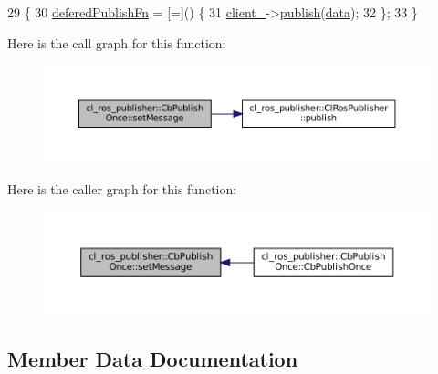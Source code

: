 \begin{DoxyCode}
29     \{
30         \hyperlink{classcl__ros__publisher_1_1CbPublishOnce_a6222a91fb87cd3118ca9f84ff857c696}{deferedPublishFn} = [=]() \{
31             \hyperlink{classcl__ros__publisher_1_1CbPublishOnce_aabb127ac2192a295ce9d11c63f3c9595}{client\_}->\hyperlink{classcl__ros__publisher_1_1ClRosPublisher_a3517d62fb0703a0a72efe6de7ad1a6d8}{publish}(\hyperlink{namespacekeyboard__server__node_abfec01745fb17e2aa813913bea03d707}{data});
32         \};
33     \}
\end{DoxyCode}
Here is the call graph for this function\+:
\nopagebreak
\begin{figure}[H]
\begin{center}
\leavevmode
\includegraphics[width=350pt]{classcl__ros__publisher_1_1CbPublishOnce_aedf3cb7940951d76773f46c807f34a58_cgraph}
\end{center}
\end{figure}
Here is the caller graph for this function\+:
\nopagebreak
\begin{figure}[H]
\begin{center}
\leavevmode
\includegraphics[width=350pt]{classcl__ros__publisher_1_1CbPublishOnce_aedf3cb7940951d76773f46c807f34a58_icgraph}
\end{center}
\end{figure}


\subsection{Member Data Documentation}
\mbox{\label{classcl__ros__publisher_1_1CbPublishOnce_aabb127ac2192a295ce9d11c63f3c9595}} 
